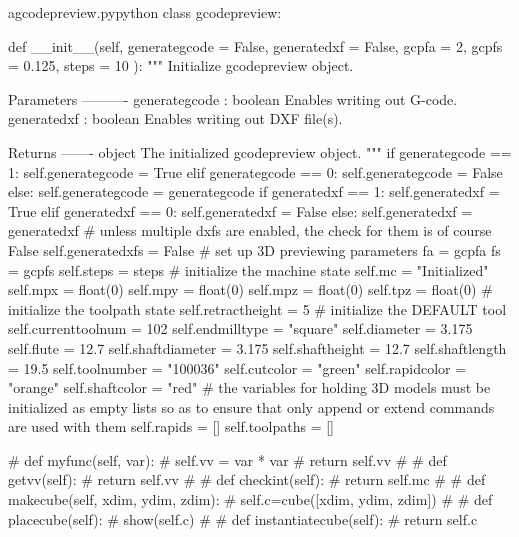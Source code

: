 \documentclass{ltxdoc}
\begin{document}
\lstset{firstnumber=\thegcpy}
\begin{writecode}{a}{gcodepreview.py}{python}
class gcodepreview:

    def __init__(self, 
                 generategcode = False,
                 generatedxf = False,
                 gcpfa = 2,
                 gcpfs = 0.125,
                 steps = 10
                 ):
        """
        Initialize gcodepreview object.
    
        Parameters
        ----------
        generategcode : boolean
                        Enables writing out G-code.
        generatedxf   : boolean
                        Enables writing out DXF file(s).
        
        Returns
        -------
        object
            The initialized gcodepreview object.
        """
        if generategcode == 1:
            self.generategcode = True
        elif generategcode == 0:
            self.generategcode = False
        else:
            self.generategcode = generategcode
        if generatedxf == 1:
            self.generatedxf = True
        elif generatedxf == 0:
            self.generatedxf = False
        else:
            self.generatedxf = generatedxf
# unless multiple dxfs are enabled, the check for them is of course False
        self.generatedxfs = False
# set up 3D previewing parameters
        fa = gcpfa
        fs = gcpfs
        self.steps = steps
# initialize the machine state
        self.mc = "Initialized"
        self.mpx = float(0)
        self.mpy = float(0)
        self.mpz = float(0)
        self.tpz = float(0)
# initialize the toolpath state
        self.retractheight = 5
# initialize the DEFAULT tool
        self.currenttoolnum = 102
        self.endmilltype = "square"
        self.diameter = 3.175
        self.flute = 12.7
        self.shaftdiameter = 3.175
        self.shaftheight = 12.7
        self.shaftlength = 19.5
        self.toolnumber = "100036"
        self.cutcolor = "green"
        self.rapidcolor = "orange"
        self.shaftcolor = "red"
# the variables for holding 3D models must be initialized as empty lists so as to ensure that only append or extend commands are used with them
        self.rapids = []
        self.toolpaths = []

#    def myfunc(self, var):
#        self.vv = var * var
#        return self.vv
#
#    def getvv(self):
#        return self.vv
#        
#    def checkint(self):
#        return self.mc
#
#    def makecube(self, xdim, ydim, zdim):
#        self.c=cube([xdim, ydim, zdim])
#        
#    def placecube(self):
#        show(self.c)
#
#    def instantiatecube(self):
#        return self.c

\end{writecode}
\addtocounter{gcpy}{85}
\end{document}
